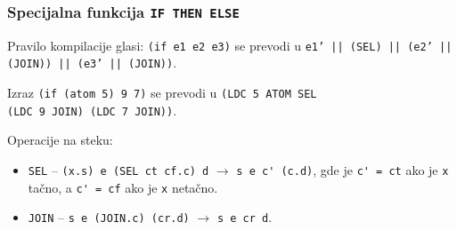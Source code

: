 \subsubsection{Specijalna funkcija {\tt IF THEN ELSE}}

Pravilo kompilacije glasi: \verb|(if e1 e2 e3)| se prevodi u
\texttt{e1' || (SEL) || (e2' || (JOIN)) || (e3' || (JOIN))}.

\begin{primer}
	Izraz \verb|(if (atom 5) 9 7)| se prevodi u \verb|(LDC 5 ATOM SEL|\\
	\verb|(LDC 9 JOIN) (LDC 7 JOIN))|.
\end{primer}

Operacije na steku:
\begin{itemize}
	\item \verb|SEL| -- \verb|(x.s) e (SEL ct cf.c) d| $\rightarrow$ \verb|s e c' (c.d)|, gde je \verb|c' = ct| ako je \verb|x| tačno, a \verb|c' = cf| ako je \verb|x| netačno.
	
	\item \verb|JOIN| -- \verb|s e (JOIN.c) (cr.d)| $\rightarrow$ \verb|s e cr d|.\\
\end{itemize}



